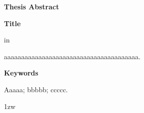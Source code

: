 \begin{center}
{\bf {\large Thesis Abstract}}

\vspace{2ex}

{\bf {\large Title}}
\end{center}

\vspace{3ex}

 in

aaaaaaaaaaaaaaaaaaaaaaaaaaaaaaaaaaaaaaa.

\vspace{4ex}

\noindent
{\bf Keywords}

\noindent
Aaaaa; bbbbb; ccccc.
 
\parindent 1zw